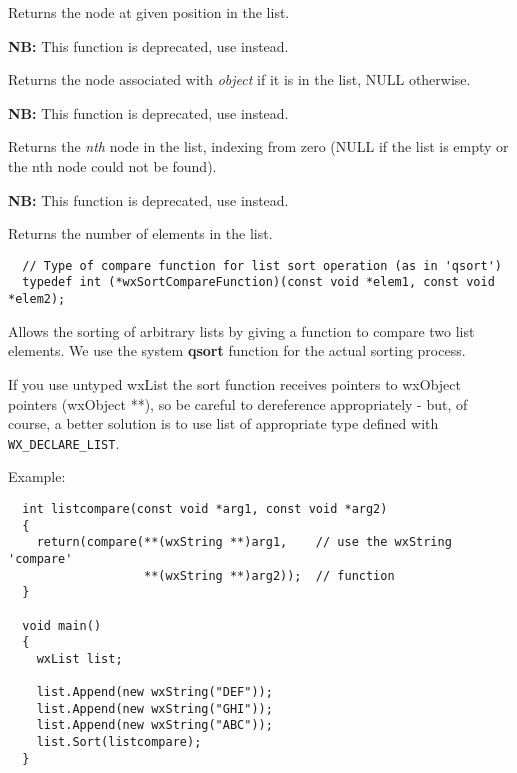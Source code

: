 Returns the node at given position in the list.

\label{wxlistmember}


{\bf NB:} This function is deprecated, use  instead.

Returns the node associated with {\it object} if it is in the list, NULL otherwise.

\label{wxlistnth}


{\bf NB:} This function is deprecated, use  instead.

Returns the {\it nth} node in the list, indexing from zero (NULL if the list is empty
or the nth node could not be found).

\label{wxlistnumber}


{\bf NB:} This function is deprecated, use  instead.

Returns the number of elements in the list.

\label{wxlistsort}


\begin{verbatim}
  // Type of compare function for list sort operation (as in 'qsort')
  typedef int (*wxSortCompareFunction)(const void *elem1, const void *elem2);
\end{verbatim}

Allows the sorting of arbitrary lists by giving
a function to compare two list elements. We use the system {\bf qsort} function
for the actual sorting process.

If you use untyped wxList the sort function receives pointers to wxObject
pointers (wxObject **), so be careful to dereference appropriately - but,
of course, a better solution is to use list of appropriate type defined with
{\tt WX\_DECLARE\_LIST}.

Example:

\begin{verbatim}
  int listcompare(const void *arg1, const void *arg2)
  {
    return(compare(**(wxString **)arg1,    // use the wxString 'compare'
                   **(wxString **)arg2));  // function 
  }

  void main()
  {
    wxList list;

    list.Append(new wxString("DEF"));
    list.Append(new wxString("GHI"));
    list.Append(new wxString("ABC"));
    list.Sort(listcompare);
  }
\end{verbatim}

